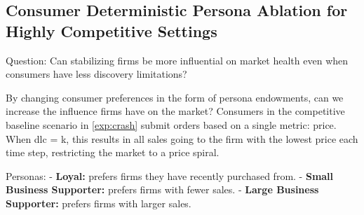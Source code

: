 
\subsection{Consumer Deterministic Persona Ablation for Highly Competitive Settings}

Question: Can stabilizing firms be more influential on market health even when consumers have less discovery limitations? 

By changing consumer preferences in the form of persona endowments, can we increase the influence firms have on the market? Consumers in the competitive baseline scenario in \ref{exp:crash} submit orders based on a single metric: price. When dlc = k, this results in all sales going to the firm with the lowest price each time step, restricting the market to a price spiral. 

Personas: 
- \textbf{Loyal:} prefers firms they have recently purchased from.
-  \textbf{Small Business Supporter:} prefers firms with fewer sales.
-  \textbf{Large Business Supporter:} prefers firms with larger sales. 

